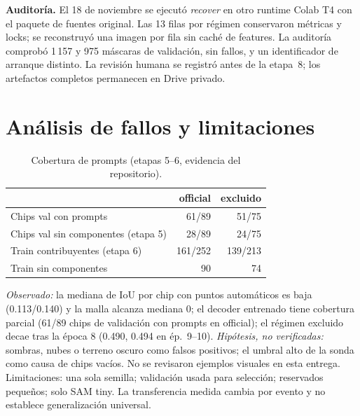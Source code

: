 \documentclass[conference]{IEEEtran}
\begin{document}
\textbf{Auditoría.} El 18 de noviembre se ejecutó \emph{recover} en otro runtime Colab T4 con el paquete de fuentes original. Las 13 filas por r\'egimen conservaron m\'etricas y locks; se reconstruy\'o una imagen por fila sin cach\'e de features. La auditor\'ia comprob\'o 1\,157 y 975 m\'ascaras de validaci\'on, sin fallos, y un identificador de arranque distinto. La revisi\'on humana se registr\'o antes de la etapa~8; los artefactos completos permanecen en Drive privado.

\section{An\'alisis de fallos y limitaciones}
\begin{table}[!t]\centering\footnotesize\caption{Cobertura de prompts (etapas 5--6, evidencia del repositorio).}
\begin{tabular}{@{}p{3.3cm}rr@{}}\toprule
& official & excluido\\\midrule
Chips val con prompts & 61/89 & 51/75\\
Chips val sin componentes (etapa 5) & 28/89 & 24/75\\
Train contribuyentes (etapa 6) & 161/252 & 139/213\\
Train sin componentes & 90 & 74\\\bottomrule
\end{tabular}\end{table}

\emph{Observado:} la mediana de IoU por chip con puntos autom\'aticos es baja (0.113/0.140) y la malla alcanza mediana 0; el decoder entrenado tiene cobertura parcial (61/89 chips de validaci\'on con prompts en official); el r\'egimen excluido decae tras la \'epoca 8 (0.490, 0.494 en \'ep.~9--10). \emph{Hip\'otesis, no verificadas:} sombras, nubes o terreno oscuro como falsos positivos; el umbral alto de la sonda como causa de chips vac\'ios. No se revisaron ejemplos visuales en esta entrega. Limitaciones: una sola semilla; validaci\'on usada para selecci\'on; reservados peque\~nos; solo SAM tiny. La transferencia medida cambia por evento y no establece generalizaci\'on universal.
\end{document}
